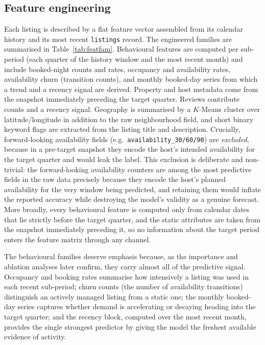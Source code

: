 \documentclass[review,12pt]{elsarticle}
\begin{document}
\subsection{Feature engineering}
Each listing is described by a flat feature vector assembled from its calendar
history and its most recent \texttt{listings} record. The engineered families are
summarised in Table~\ref{tab:featfam}. Behavioural features are computed per
sub-period (each quarter of the history window and the most recent month) and
include booked-night counts and rates, occupancy and availability rates,
availability churn (transition counts), and monthly booked-day series from which a
trend and a recency signal are derived. Property and host metadata come from the
snapshot immediately preceding the target quarter. Reviews contribute counts and a
recency signal. Geography is summarised by a $K$-Means cluster over
latitude/longitude in addition to the raw neighbourhood field, and short binary
keyword flags are extracted from the listing title and description. Crucially, forward-looking
availability fields (e.g.\ \texttt{availability\_30/60/90}) are \emph{excluded},
because in a pre-target snapshot they encode the host's intended availability for
the target quarter and would leak the label. This exclusion is deliberate and
non-trivial: the forward-looking availability counters are among the most
predictive fields in the raw data precisely because they encode the host's planned
availability for the very window being predicted, and retaining them would inflate
the reported accuracy while destroying the model's validity as a genuine forecast.
More broadly, every behavioural feature is computed only from calendar dates that
lie strictly before the target quarter, and the static attributes are taken from
the snapshot immediately preceding it, so no information about the target period
enters the feature matrix through any channel.

The behavioural families deserve emphasis because, as the importance and ablation
analyses later confirm, they carry almost all of the predictive signal. Occupancy
and booking rates summarise how intensively a listing was used in each recent
sub-period; churn counts (the number of availability transitions) distinguish an
actively managed listing from a static one; the monthly booked-day series captures
whether demand is accelerating or decaying heading into the target quarter; and the
recency block, computed over the most recent month, provides the single strongest
predictor by giving the model the freshest available evidence of activity.
\end{document}
